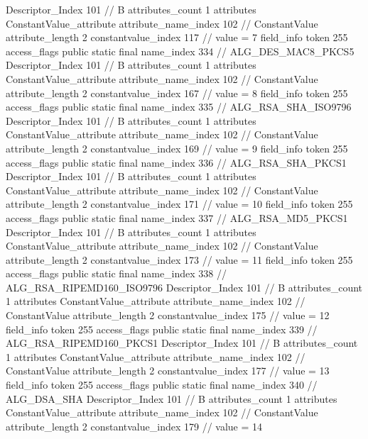 {{{{{				Descriptor_Index	101		// B
				attributes_count	1
				attributes {
				ConstantValue_attribute {
					attribute_name_index	102		// ConstantValue
					attribute_length	2
					constantvalue_index	117		// value = 7
				}
				}
			}
			field_info {
				token	255
				access_flags	public static final
				name_index	334		// ALG_DES_MAC8_PKCS5
				Descriptor_Index	101		// B
				attributes_count	1
				attributes {
				ConstantValue_attribute {
					attribute_name_index	102		// ConstantValue
					attribute_length	2
					constantvalue_index	167		// value = 8
				}
				}
			}
			field_info {
				token	255
				access_flags	public static final
				name_index	335		// ALG_RSA_SHA_ISO9796
				Descriptor_Index	101		// B
				attributes_count	1
				attributes {
				ConstantValue_attribute {
					attribute_name_index	102		// ConstantValue
					attribute_length	2
					constantvalue_index	169		// value = 9
				}
				}
			}
			field_info {
				token	255
				access_flags	public static final
				name_index	336		// ALG_RSA_SHA_PKCS1
				Descriptor_Index	101		// B
				attributes_count	1
				attributes {
				ConstantValue_attribute {
					attribute_name_index	102		// ConstantValue
					attribute_length	2
					constantvalue_index	171		// value = 10
				}
				}
			}
			field_info {
				token	255
				access_flags	public static final
				name_index	337		// ALG_RSA_MD5_PKCS1
				Descriptor_Index	101		// B
				attributes_count	1
				attributes {
				ConstantValue_attribute {
					attribute_name_index	102		// ConstantValue
					attribute_length	2
					constantvalue_index	173		// value = 11
				}
				}
			}
			field_info {
				token	255
				access_flags	public static final
				name_index	338		// ALG_RSA_RIPEMD160_ISO9796
				Descriptor_Index	101		// B
				attributes_count	1
				attributes {
				ConstantValue_attribute {
					attribute_name_index	102		// ConstantValue
					attribute_length	2
					constantvalue_index	175		// value = 12
				}
				}
			}
			field_info {
				token	255
				access_flags	public static final
				name_index	339		// ALG_RSA_RIPEMD160_PKCS1
				Descriptor_Index	101		// B
				attributes_count	1
				attributes {
				ConstantValue_attribute {
					attribute_name_index	102		// ConstantValue
					attribute_length	2
					constantvalue_index	177		// value = 13
				}
				}
			}
			field_info {
				token	255
				access_flags	public static final
				name_index	340		// ALG_DSA_SHA
				Descriptor_Index	101		// B
				attributes_count	1
				attributes {
				ConstantValue_attribute {
					attribute_name_index	102		// ConstantValue
					attribute_length	2
					constantvalue_index	179		// value = 14
}}}}}}}
